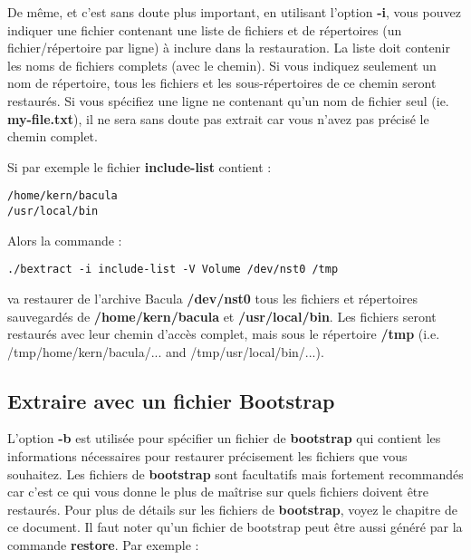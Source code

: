 De même, et c'est sans doute plus important, en utilisant l'option {\bf -i},
vous pouvez indiquer une fichier contenant une liste de fichiers et de 
répertoires (un fichier/répertoire par ligne) à inclure dans la restauration. La
liste doit contenir les noms de fichiers complets (avec le chemin). Si vous
indiquez seulement un nom de répertoire, tous les fichiers et les 
sous-répertoires de ce chemin seront restaurés. Si vous spécifiez une ligne ne
contenant qu'un nom de fichier seul (ie. {\bf my-file.txt}), il ne sera sans
doute pas extrait car vous n'avez pas précisé le chemin complet.

Si par exemple le fichier {\bf include-list} contient :

\footnotesize
\begin{verbatim}
/home/kern/bacula
/usr/local/bin
\end{verbatim}
\normalsize

Alors la commande : 

\footnotesize
\begin{verbatim}
./bextract -i include-list -V Volume /dev/nst0 /tmp
\end{verbatim}
\normalsize

va restaurer de l'archive Bacula {\bf /dev/nst0} tous les fichiers et 
répertoires sauvegardés de {\bf /home/kern/bacula} et {\bf /usr/local/bin}.
Les fichiers seront restaurés avec leur chemin d'accès complet, mais sous le
répertoire {\bf /tmp} (i.e. /tmp/home/kern/bacula/... and
/tmp/usr/local/bin/...).

\subsection{Extraire avec un fichier Bootstrap}

L'option {\bf -b} est utilisée pour spécifier un fichier de {\bf bootstrap} 
qui contient les informations nécessaires pour restaurer précisement les 
fichiers que vous souhaitez. Les fichiers de {\bf bootstrap} sont facultatifs
mais fortement recommandés car c'est ce qui vous donne le plus de maîtrise sur
quels fichiers doivent être restaurés. Pour plus de détails sur les fichiers de
{\bf bootstrap}, voyez le chapitre 
 de
ce document. Il faut noter qu'un fichier de bootstrap peut être aussi généré par
la commande {\bf restore}. Par exemple : 

